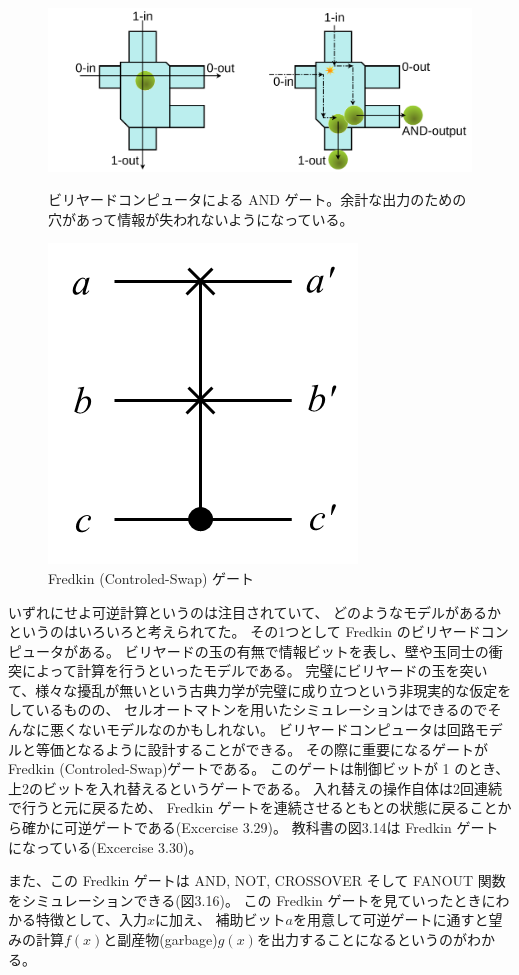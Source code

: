 \documentclass[../../master.tex]{subfiles}
\begin{document}
\begin{figure}
    \centering
    \includegraphics[width=0.4\columnwidth]{Toffoli_BilliardBall.png}
    \caption{ビリヤードコンピュータによる AND ゲート。余計な出力のための穴があって情報が失われないようになっている。}
    \includegraphics[width=0.3\columnwidth]{C-Swap.png}
    \caption{Fredkin (Controled-Swap) ゲート}
\end{figure}
いずれにせよ可逆計算というのは注目されていて、
どのようなモデルがあるかというのはいろいろと考えられてた。
その1つとして Fredkin のビリヤードコンピュータがある。
ビリヤードの玉の有無で情報ビットを表し、壁や玉同士の衝突によって計算を行うといったモデルである。
完璧にビリヤードの玉を突いて、様々な擾乱が無いという古典力学が完璧に成り立つという非現実的な仮定をしているものの、
セルオートマトンを用いたシミュレーションはできるのでそんなに悪くないモデルなのかもしれない。
ビリヤードコンピュータは回路モデルと等価となるように設計することができる。
その際に重要になるゲートが Fredkin (Controled-Swap)ゲートである。
このゲートは制御ビットが 1 のとき、上2のビットを入れ替えるというゲートである。
入れ替えの操作自体は2回連続で行うと元に戻るため、
Fredkin ゲートを連続させるともとの状態に戻ることから確かに可逆ゲートである(Excercise 3.29)。
教科書の図3.14は Fredkin ゲートになっている(Excercise 3.30)。

また、この Fredkin ゲートは AND, NOT, CROSSOVER そして FANOUT 関数をシミュレーションできる(図3.16)。
この Fredkin ゲートを見ていったときにわかる特徴として、入力\(x\)に加え、
補助ビット\(a\)を用意して可逆ゲートに通すと望みの計算\(f(x)\)と副産物(garbage)\(g(x)\)を出力することになるというのがわかる。
\end{document}
